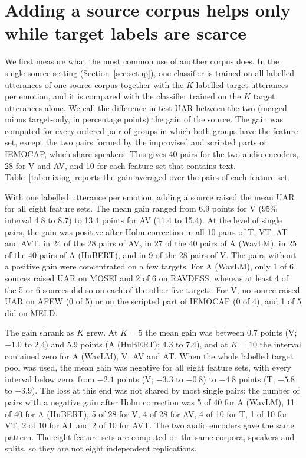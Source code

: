 
\section{Adding a source corpus helps only while target labels are scarce}
\label{sec:mixing}

We first measure what the most common use of another corpus does. In the single-source setting (Section~\ref{sec:setup}), one classifier is trained on all labelled utterances of one source corpus together with the $K$ labelled target utterances per emotion, and it is compared with the classifier trained on the $K$ target utterances alone. We call the difference in test UAR between the two (merged minus target-only, in percentage points) the gain of the source. The gain was computed for every ordered pair of groups in which both groups have the feature set, except the two pairs formed by the improvised and scripted parts of IEMOCAP, which share speakers. This gives 40 pairs for the two audio encoders, 28 for V and AV, and 10 for each feature set that contains text. Table~\ref{tab:mixing} reports the gain averaged over the pairs of each feature set.



With one labelled utterance per emotion, adding a source raised the mean UAR for all eight feature sets. The mean gain ranged from 6.9 points for V (95\% interval 4.8 to 8.7) to 13.4 points for AV (11.4 to 15.4). At the level of single pairs, the gain was positive after Holm correction in all 10 pairs of T, VT, AT and AVT, in 24 of the 28 pairs of AV, in 27 of the 40 pairs of A (WavLM), in 25 of the 40 pairs of A (HuBERT), and in 9 of the 28 pairs of V. The pairs without a positive gain were concentrated on a few targets. For A (WavLM), only 1 of 6 sources raised UAR on MOSEI and 2 of 6 on RAVDESS, whereas at least 4 of the 5 or 6 sources did so on each of the other five targets. For V, no source raised UAR on AFEW (0 of 5) or on the scripted part of IEMOCAP (0 of 4), and 1 of 5 did on MELD.

The gain shrank as $K$ grew. At $K=5$ the mean gain was between 0.7 points (V; $-1.0$ to 2.4) and 5.9 points (A (HuBERT); 4.3 to 7.4), and at $K=10$ the interval contained zero for A (WavLM), V, AV and AT. When the whole labelled target pool was used, the mean gain was negative for all eight feature sets, with every interval below zero, from $-2.1$ points (V; $-3.3$ to $-0.8$) to $-4.8$ points (T; $-5.8$ to $-3.9$). The loss at this end was not shared by most single pairs: the number of pairs with a negative gain after Holm correction was 5 of 40 for A (WavLM), 11 of 40 for A (HuBERT), 5 of 28 for V, 4 of 28 for AV, 4 of 10 for T, 1 of 10 for VT, 2 of 10 for AT and 2 of 10 for AVT. The two audio encoders gave the same pattern. The eight feature sets are computed on the same corpora, speakers and splits, so they are not eight independent replications.

